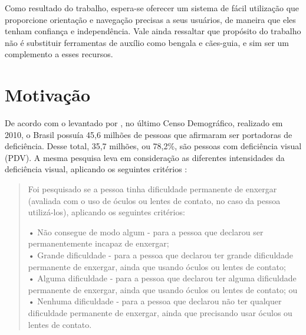 \documentclass[english,brazilian]{UNISINOSmonografia}
\begin{document}
Como resultado do trabalho, espera-se oferecer um sistema de fácil utilização que proporcione orientação e navegação precisas a seus usuários, de maneira que eles tenham confiança e independência. Vale ainda ressaltar que propósito do trabalho não é substituir ferramentas de auxílio como bengala e cães-guia, e sim ser um complemento a esses recursos.

	\section{Motivação}


De acordo com o levantado por , no último Censo Demográfico, realizado em 2010, o Brasil possuía 45,6 milhões de pessoas que afirmaram ser portadoras de deficiência. Desse total, 35,7 milhões, ou 78,2\%, são pessoas com deficiência visual (PDV). A mesma pesquisa leva em consideração as diferentes intensidades da deficiência visual, aplicando os seguintes critérios \cite{IBGE2010}: 

\begin{quote}
	Foi pesquisado se a pessoa tinha dificuldade permanente de enxergar (avaliada com o uso de óculos ou lentes de contato, no caso da pessoa utilizá-los), aplicando os seguintes critérios:
		
	• Não consegue de modo algum - para a pessoa que declarou ser permanentemente incapaz de enxergar; \\
	• Grande dificuldade - para a pessoa que declarou ter grande dificuldade permanente de enxergar, ainda que usando óculos ou lentes de contato; \\
	• Alguma dificuldade - para a pessoa que declarou ter alguma dificuldade permanente de enxergar, ainda que usando óculos ou lentes de contato; ou \\
	• Nenhuma dificuldade - para a pessoa que declarou não ter qualquer dificuldade permanente de enxergar, ainda que precisando usar óculos ou lentes de contato.
\end{quote}
\end{document}
